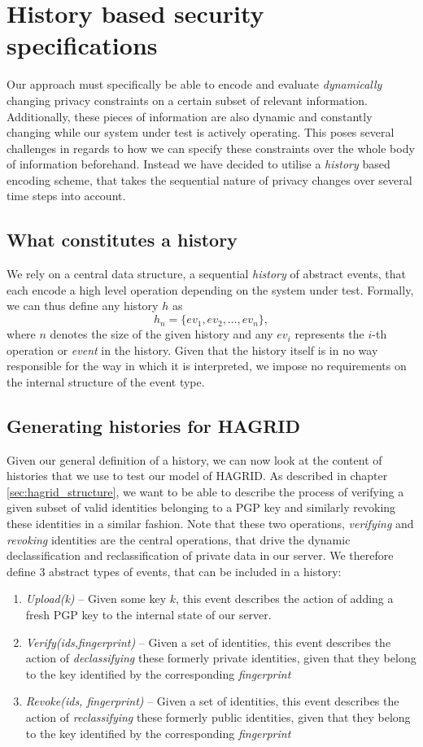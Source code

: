 \section{History based security specifications}
Our approach must specifically be able to encode and evaluate \emph{dynamically} changing privacy constraints on a certain subset of relevant information. Additionally, these pieces of information are also dynamic and constantly changing while our system under test is actively operating. This poses several challenges in regards to how we can specify these constraints over the whole body of information beforehand. 
Instead we have decided to utilise a \emph{history} based encoding scheme, that takes the sequential nature of privacy changes over several time steps into account.
\subsection{What constitutes a history}
We rely on a central data structure, a sequential \emph{history} of abstract events, that each encode a high level operation depending on the system under test.
Formally, we can thus define any history \(h\) as
\[
    h_n = \{ev_1,ev_2,\dots, ev_n\},
\]
where \(n\) denotes the size of the given history and any \(ev_i\) represents the \(i\)-th operation or \emph{event} in the history.
Given that the history itself is in no way responsible for the way in which it is interpreted, we impose no requirements on the internal structure of the event type.
\subsection{Generating histories for HAGRID}
Given our general definition of a history, we can now look at the content of histories that we use to test our model of HAGRID. 
As described in chapter \ref{sec:hagrid_structure}, we want to be able to describe the process of verifying a given subset of valid identities belonging to a PGP key and similarly revoking these identities in a similar fashion. Note that these two operations, \emph{verifying} and \emph{revoking} identities are the central operations, that drive the dynamic declassification and reclassification of private data in our server.
We therefore define 3 abstract types of events, that can be included in a history: 
\begin{enumerate}
    \item \emph{Upload(k)} -- Given some key \(k\), this event describes the action of adding a fresh PGP key to the internal state of our server.
    \item \emph{Verify(ids,fingerprint)} -- Given a set of identities, this event describes the action of \emph{declassifying} these formerly private identities, given that they belong to the key identified by the corresponding \emph{fingerprint}
    \item \emph{Revoke(ids, fingerprint)} -- Given a set of identities, this event describes the action of \emph{reclassifying} these formerly public identities, given that they belong to the key identified by the corresponding \emph{fingerprint}
\end{enumerate}

